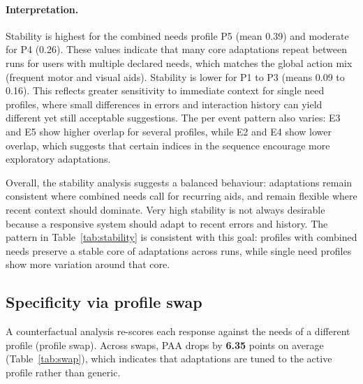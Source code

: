\documentclass[openany]{book}
\begin{document}
\paragraph{Interpretation.}
Stability is highest for the combined needs profile P5 (mean 0.39) and moderate for P4 (0.26). These values indicate that many core adaptations repeat between runs for users with multiple declared needs, which matches the global action mix (frequent motor and visual aids). Stability is lower for P1 to P3 (means 0.09 to 0.16). This reflects greater sensitivity to immediate context for single need profiles, where small differences in errors and interaction history can yield different yet still acceptable suggestions. The per event pattern also varies: E3 and E5 show higher overlap for several profiles, while E2 and E4 show lower overlap, which suggests that certain indices in the sequence encourage more exploratory adaptations.

Overall, the stability analysis suggests a balanced behaviour: adaptations remain consistent where combined needs call for recurring aids, and remain flexible where recent context should dominate. Very high stability is not always desirable because a responsive system should adapt to recent errors and history. The pattern in Table~\ref{tab:stability} is consistent with this goal: profiles with combined needs preserve a stable core of adaptations across runs, while single need profiles show more variation around that core.



\subsection{Specificity via profile swap}
\label{sec:profile-swap}
A counterfactual analysis re-scores each response against the needs of a different profile (profile swap). Across swaps, PAA drops by \textbf{6.35} points on average (Table~\ref{tab:swap}), which indicates that adaptations are tuned to the active profile rather than generic.
\end{document}
